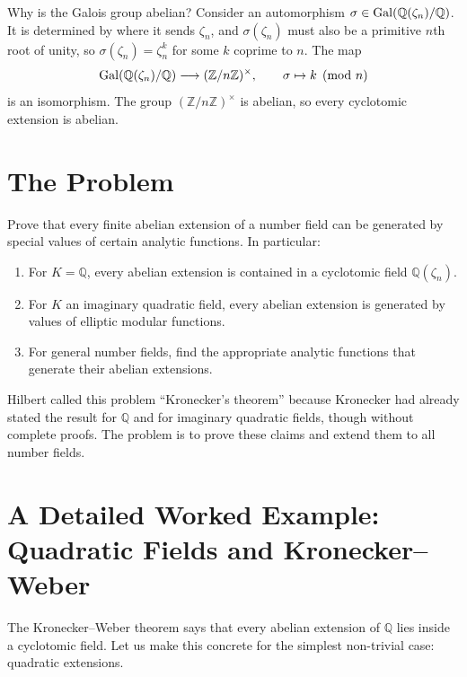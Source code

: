 Why is the Galois group abelian? Consider an automorphism $\sigma \in \operatorname{Gal}(\mathbb{Q}(\zeta_n)/\mathbb{Q})$. It is determined by where it sends $\zeta_n$, and $\sigma(\zeta_n)$ must also be a primitive $n$th root of unity, so $\sigma(\zeta_n) = \zeta_n^k$ for some $k$ coprime to $n$. The map
\[
\operatorname{Gal}(\mathbb{Q}(\zeta_n)/\mathbb{Q}) \longrightarrow (\mathbb{Z}/n\mathbb{Z})^\times,\qquad
\sigma \mapsto k \pmod{n}
\]
is an isomorphism. The group $(\mathbb{Z}/n\mathbb{Z})^\times$ is abelian, so every cyclotomic extension is abelian.

\section{The Problem}

\begin{problem_statement}
Prove that every finite abelian extension of a number field can be generated by special values of certain analytic functions. In particular:
\begin{enumerate}
    \item For $K = \mathbb{Q}$, every abelian extension is contained in a cyclotomic field $\mathbb{Q}(\zeta_n)$.
    \item For $K$ an imaginary quadratic field, every abelian extension is generated by values of elliptic modular functions.
    \item For general number fields, find the appropriate analytic functions that generate their abelian extensions.
\end{enumerate}
\end{problem_statement}

Hilbert called this problem ``Kronecker's theorem'' because Kronecker had already stated the result for $\mathbb{Q}$ and for imaginary quadratic fields, though without complete proofs. The problem is to prove these claims and extend them to all number fields.

\section[Worked Example: Quadratic Fields]{A Detailed Worked Example: Quadratic Fields and Kronecker--Weber}

The Kronecker--Weber theorem says that every abelian extension of $\mathbb{Q}$ lies inside a cyclotomic field. Let us make this concrete for the simplest non-trivial case: quadratic extensions.

